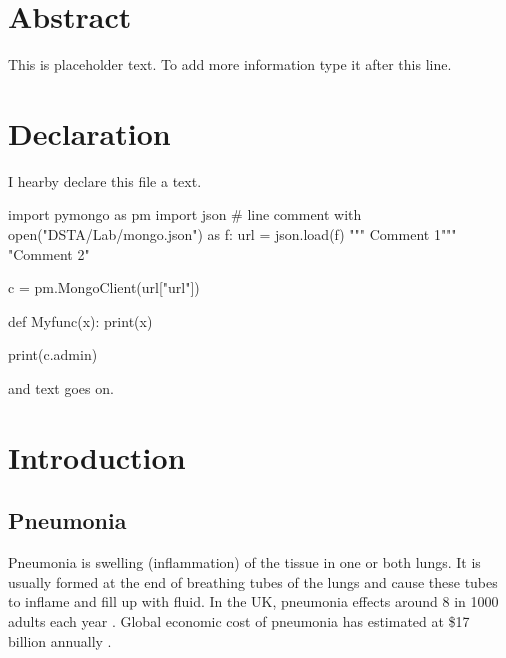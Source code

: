 \documentclass[12pt, twoside, a4paper]{article}
\begin{document}
\section*{Abstract}
This is placeholder text. To add more information type it after this line.\\
\clearpage


\section*{Declaration}
I hearby declare this file a text.

\begin{python}
    import pymongo as pm
    import json
    # line comment
    with open("DSTA/Lab/mongo.json") as f:
    url = json.load(f)
    """ Comment 1"""
    "Comment 2"

    c = pm.MongoClient(url["url"])

    def Myfunc(x):
        print(x)

    print(c.admin)
\end{python}
and text goes on.\\
\clearpage

\tableofcontents
\thispagestyle{empty}
\cleardoublepage

\setcounter{page}{1}


\section{Introduction}
\subsection{Pneumonia}
Pneumonia is swelling (inflammation) of the tissue in one or both lungs. It is usually formed at the end of breathing tubes of the lungs and cause these tubes to inflame and fill up with fluid. In the UK, pneumonia effects around 8 in 1000 adults each year \cite{nhs}. Global economic cost of pneumonia has estimated at \$17 billion annually \cite{cost}.

\clearpage

\printbibliography
{}
\end{document}

